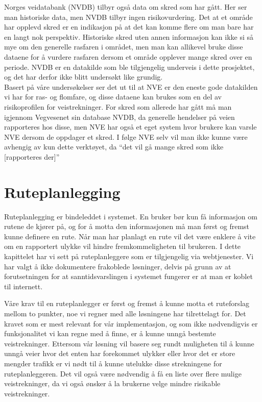 \documentclass[a4paper,norsk,oneside]{book}
\begin{document}
Norges veidatabank (NVDB) tilbyr også data om skred som har gått. Her ser man historiske data, men NVDB tilbyr ingen risikovurdering. Det at et område har opplevd skred er en indikasjon på at det kan komme flere om man bare har en langt nok perspektiv.  Historiske skred uten annen informasjon kan ikke si så mye om den generelle rasfaren i området, men man kan allikevel bruke disse dataene for å vurdere rasfaren dersom et område opplever mange skred over en periode. NVDB er en datakilde som ble tilgjengelig underveis i dette prosjektet, og det har derfor ikke blitt undersøkt like grundig.\\
\newline
Basert på våre undersøkelser ser det ut til at NVE er den eneste gode datakilden vi har for ras- og flomfare, og disse dataene kan brukes som en del av risikoprofilen for veistrekninger. For skred som allerede har gått må man igjennom Vegvesenet sin database NVDB, da generelle hendelser på veien rapporteres hos disse, men NVE har også et eget system hvor brukere kan varsle NVE dersom de oppdager et skred. I følge NVE selv vil man ikke kunne være avhengig av kun dette verktøyet, da “det vil gå mange skred som ikke [rapporteres der]”\cite{nve}

\section{Ruteplanlegging}
Ruteplanlegging er bindeleddet i systemet. En bruker bør kun få informasjon om rutene de kjører på, og for å motta den informasjonen må man først og fremst kunne definere en rute. Når man har planlagt en rute vil det være enklere å vite om en rapportert ulykke vil hindre fremkommeligheten til brukeren. I dette kapittelet har vi sett på ruteplanleggere som er tilgjengelig via webtjenester. Vi har valgt å ikke dokumentere frakoblede løsninger, delvis på grunn av at forutsetningen for at sanntidsvarslingen i systemet fungerer er at man er koblet til internett.

Våre krav til en ruteplanlegger er først og fremst å kunne motta et ruteforslag mellom to punkter, noe vi regner med alle løsningene har tilrettelagt for. Det kravet som er mest relevant for vår implementasjon, og som ikke nødvendigvis er funksjonalitet vi kan regne med å finne, er å kunne unngå bestemte veistrekninger. Ettersom vår løsning vil basere seg rundt muligheten til å kunne unngå veier hvor det enten har forekommet ulykker eller hvor det er store mengder trafikk er vi nødt til å kunne utelukke disse strekningene for ruteplanleggeren. Det vil også være nødvendig å få en liste over flere mulige veistrekninger, da vi også ønsker å la brukerne velge mindre risikable veistrekninger.
	
\end{document}
